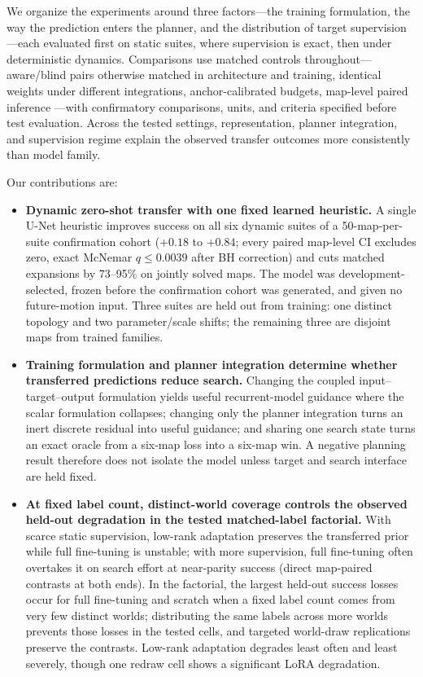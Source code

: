 \documentclass[letterpaper]{article} %
\begin{document}
We organize the experiments around three factors---the training formulation, the way the prediction enters the planner, and the distribution of target supervision---each evaluated first on static suites, where supervision is exact, then under deterministic dynamics. Comparisons use matched controls throughout---aware/blind pairs otherwise matched in architecture and training, identical weights under different integrations, anchor-calibrated budgets, map-level paired inference \citep{henderson2018matters,agarwal2021precipice,pineau2021reproducibility}---with confirmatory comparisons, units, and criteria specified before test evaluation. Across the tested settings, representation, planner integration, and supervision regime explain the observed transfer outcomes more consistently than model family.

Our contributions are:
\begin{itemize}
    \item \textbf{Dynamic zero-shot transfer with one fixed learned heuristic.} A single U-Net heuristic improves success on all six dynamic suites of a 50-map-per-suite confirmation cohort ($+0.18$ to $+0.84$; every paired map-level CI excludes zero, exact McNemar $q \leq 0.0039$ after BH correction) and cuts matched expansions by 73--95\% on jointly solved maps. The model was development-selected, frozen before the confirmation cohort was generated, and given no future-motion input. Three suites are held out from training: one distinct topology and two parameter/scale shifts; the remaining three are disjoint maps from trained families.
    \item \textbf{Training formulation and planner integration determine whether transferred predictions reduce search.} Changing the coupled input--target--output formulation yields useful recurrent-model guidance where the scalar formulation collapses; changing only the planner integration turns an inert discrete residual into useful guidance; and sharing one search state turns an exact oracle from a six-map loss into a six-map win. A negative planning result therefore does not isolate the model unless target and search interface are held fixed.
    \item \textbf{At fixed label count, distinct-world coverage controls the observed held-out degradation in the tested matched-label factorial.} With scarce static supervision, low-rank adaptation preserves the transferred prior while full fine-tuning is unstable; with more supervision, full fine-tuning often overtakes it on search effort at near-parity success (direct map-paired contrasts at both ends). In the factorial, the largest held-out success losses occur for full fine-tuning and scratch when a fixed label count comes from very few distinct worlds; distributing the same labels across more worlds prevents those losses in the tested cells, and targeted world-draw replications preserve the contrasts. Low-rank adaptation degrades least often and least severely, though one redraw cell shows a significant LoRA degradation.
\end{itemize}
\end{document}
